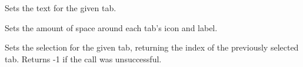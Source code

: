 Sets the text for the given tab.

\label{wxtabctrlsetpadding}


Sets the amount of space around each tab's icon and label.

\label{wxtabctrlsetselection}


Sets the selection for the given tab, returning the index of the previously
selected tab. Returns -1 if the call was unsuccessful.




